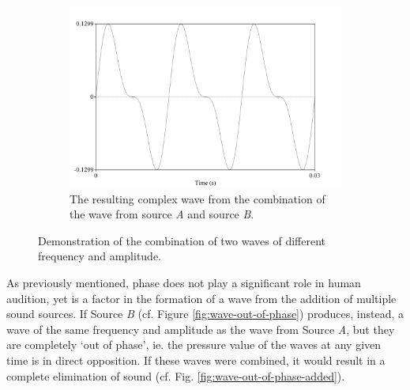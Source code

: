 \begin{figure}[H]
\begin{center}
\begin{subfigure}{0.5\textwidth}
  \includegraphics[width=\textwidth]{figure/sound-wave-addition-combined.png}
  \caption{The resulting complex wave from the combination of the wave from source \textit{A} and source \textit{B}.}
  \label{fig:sound-wave-addition-combined}
\end{subfigure}
\end{center}
\caption{Demonstration of the combination of two waves of different frequency and amplitude.}
\label{fig:sound-wave-addition}
\end{figure}

As previously mentioned, phase does not play a significant role in human audition, yet is a factor in the formation of a wave from the addition of multiple sound sources.  If Source \textit{B} (cf. Figure \ref{fig:wave-out-of-phase}) produces, instead, a wave of the same frequency and amplitude as the wave from Source \textit{A}, but they are completely `out of phase', ie. the pressure value of the waves at any given time is in direct opposition.  If these waves were combined, it would result in a complete elimination of sound (cf. Fig. \ref{fig:wave-out-of-phase-added}).

